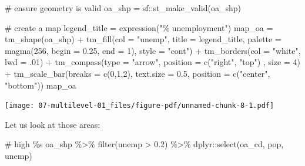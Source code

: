 \documentclass[
  letterpaper,
  DIV=11,
  numbers=noendperiod,
  oneside]{scrreprt}
\newenvironment{Shaded}{\begin{snugshade}}{\end{snugshade}}
\newcommand{\AttributeTok}[1]{\textcolor[rgb]{0.40,0.45,0.13}{#1}}
\newcommand{\CommentTok}[1]{\textcolor[rgb]{0.37,0.37,0.37}{#1}}
\newcommand{\DecValTok}[1]{\textcolor[rgb]{0.68,0.00,0.00}{#1}}
\newcommand{\FloatTok}[1]{\textcolor[rgb]{0.68,0.00,0.00}{#1}}
\newcommand{\FunctionTok}[1]{\textcolor[rgb]{0.28,0.35,0.67}{#1}}
\newcommand{\NormalTok}[1]{\textcolor[rgb]{0.00,0.23,0.31}{#1}}
\newcommand{\OtherTok}[1]{\textcolor[rgb]{0.00,0.23,0.31}{#1}}
\newcommand{\SpecialCharTok}[1]{\textcolor[rgb]{0.37,0.37,0.37}{#1}}
\newcommand{\StringTok}[1]{\textcolor[rgb]{0.13,0.47,0.30}{#1}}
\begin{document}
\begin{Shaded}
\begin{Highlighting}[]
\CommentTok{\# ensure geometry is valid}
\NormalTok{oa\_shp }\OtherTok{=}\NormalTok{ sf}\SpecialCharTok{::}\FunctionTok{st\_make\_valid}\NormalTok{(oa\_shp)}

\CommentTok{\# create a map}
\NormalTok{legend\_title }\OtherTok{=} \FunctionTok{expression}\NormalTok{(}\StringTok{"\% unemployment"}\NormalTok{)}
\NormalTok{map\_oa }\OtherTok{=} \FunctionTok{tm\_shape}\NormalTok{(oa\_shp) }\SpecialCharTok{+}
  \FunctionTok{tm\_fill}\NormalTok{(}\AttributeTok{col =} \StringTok{"unemp"}\NormalTok{, }\AttributeTok{title =}\NormalTok{ legend\_title, }\AttributeTok{palette =} \FunctionTok{magma}\NormalTok{(}\DecValTok{256}\NormalTok{, }\AttributeTok{begin =} \FloatTok{0.25}\NormalTok{, }\AttributeTok{end =} \DecValTok{1}\NormalTok{), }\AttributeTok{style =} \StringTok{"cont"}\NormalTok{) }\SpecialCharTok{+} 
  \FunctionTok{tm\_borders}\NormalTok{(}\AttributeTok{col =} \StringTok{"white"}\NormalTok{, }\AttributeTok{lwd =}\NormalTok{ .}\DecValTok{01}\NormalTok{)  }\SpecialCharTok{+} 
  \FunctionTok{tm\_compass}\NormalTok{(}\AttributeTok{type =} \StringTok{"arrow"}\NormalTok{, }\AttributeTok{position =} \FunctionTok{c}\NormalTok{(}\StringTok{"right"}\NormalTok{, }\StringTok{"top"}\NormalTok{) , }\AttributeTok{size =} \DecValTok{4}\NormalTok{) }\SpecialCharTok{+} 
  \FunctionTok{tm\_scale\_bar}\NormalTok{(}\AttributeTok{breaks =} \FunctionTok{c}\NormalTok{(}\DecValTok{0}\NormalTok{,}\DecValTok{1}\NormalTok{,}\DecValTok{2}\NormalTok{), }\AttributeTok{text.size =} \FloatTok{0.5}\NormalTok{, }\AttributeTok{position =}  \FunctionTok{c}\NormalTok{(}\StringTok{"center"}\NormalTok{, }\StringTok{"bottom"}\NormalTok{)) }
\NormalTok{map\_oa}
\end{Highlighting}
\end{Shaded}

\texttt{[image: 07-multilevel-01\_files/figure-pdf/unnamed-chunk-8-1.pdf]}

Let us look at those areas:

\begin{Shaded}
\begin{Highlighting}[]
\CommentTok{\# high \%s}
\NormalTok{oa\_shp }\SpecialCharTok{\%\textgreater{}\%} \FunctionTok{filter}\NormalTok{(unemp }\SpecialCharTok{\textgreater{}} \FloatTok{0.2}\NormalTok{) }\SpecialCharTok{\%\textgreater{}\%} 
\NormalTok{  dplyr}\SpecialCharTok{::}\FunctionTok{select}\NormalTok{(oa\_cd, pop, unemp) }
\end{Highlighting}
\end{Shaded}
\end{document}
